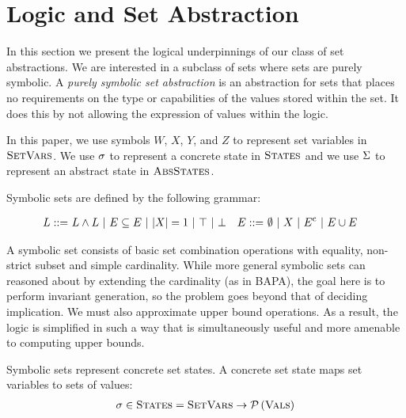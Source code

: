 \section{Logic and Set Abstraction}
\label{sec:logic-and-set-abstraction}

In this section we present the logical underpinnings of our class of set abstractions.  We are interested in a subclass of sets where sets are purely symbolic.  A \emph{purely symbolic set abstraction} is an abstraction for sets that places no requirements on the type or capabilities of the values stored within the set.  It does this by not allowing the expression of values within the logic.

In this paper, we use symbols $W$, $X$, $Y$, and $Z$ to represent set variables in $\textsc{SetVars}$.  We use $\sigma$ to represent a concrete state in $\textsc{States}$ and we use $\Sigma$ to represent an abstract state in $\textsc{AbsStates}$.
\begin{definition}
    Symbolic sets are defined by the following grammar:
    
    \begin{align*}
        L ::= & \ L \wedge L \ | \ E \subseteq E \ | \ |{X}| = 1 \ | \ \top \ | \ \bot &
        E ::= & \ \emptyset \ | \ X \ | \ {E}^{\mathrm{c}} \ | \ E \cup E
    \end{align*}
\end{definition}

A symbolic set consists of basic set combination operations with equality, non-strict subset and simple cardinality.  While more general symbolic sets can reasoned about by extending the cardinality (as in BAPA), the goal here is to perform invariant generation, so the problem goes beyond that of deciding implication.  We must also approximate upper bound operations.  As a result, the logic is simplified in such a way that is simultaneously useful and more amenable to computing upper bounds.

Symbolic sets represent concrete set states.  A concrete set state maps set variables to sets of values:
\begin{align*}
    \sigma \in \textsc{States} = \textsc{SetVars} \rightarrow \mathcal{P}\left({\textsc{Vals}}\right)
\end{align*}

